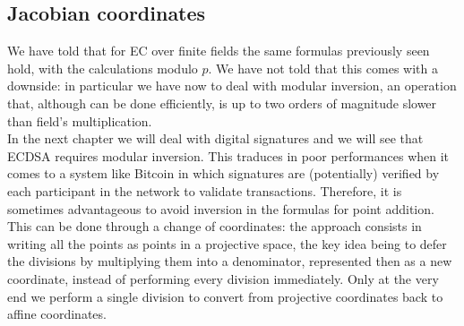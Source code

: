 \bigskip

\subsection{Jacobian coordinates}
\label{jac}
We have told that for EC over finite fields the same formulas previously seen hold, with the calculations modulo $p$. We have not told that this comes with a downside: in particular we have now to deal with modular inversion, an operation that, although can be done efficiently, is up to two orders of magnitude slower than field's multiplication.
\\
In the next chapter we will deal with digital signatures and we will see that ECDSA requires modular inversion. This traduces in poor performances when it comes to a system like Bitcoin in which signatures are (potentially) verified by each participant in the network to validate transactions. Therefore, it is sometimes advantageous to avoid inversion in the formulas for point addition. This can be done through a change of coordinates: the approach consists in writing all the points as points in a projective space, the key idea being to defer the divisions by multiplying them into a denominator, represented then as a new coordinate, instead of performing every division immediately. Only at the very end we perform a single division to convert from projective coordinates back to affine coordinates. 


